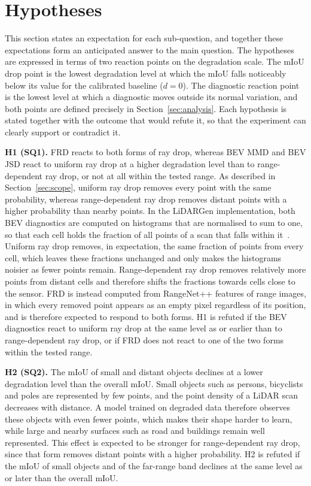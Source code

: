 \section{Hypotheses}\label{sec:hypotheses}
This section states an expectation for each sub-question, and together these expectations form an anticipated answer to the main question. The hypotheses are expressed in terms of two reaction points on the degradation scale. The mIoU drop point is the lowest degradation level at which the mIoU falls noticeably below its value for the calibrated baseline ($d=0$). The diagnostic reaction point is the lowest level at which a diagnostic moves outside its normal variation, and both points are defined precisely in Section~\ref{sec:analysis}. Each hypothesis is stated together with the outcome that would refute it, so that the experiment can clearly support or contradict it.

\textbf{H1 (SQ1).} FRD reacts to both forms of ray drop, whereas BEV MMD and BEV JSD react to uniform ray drop at a higher degradation level than to range-dependent ray drop, or not at all within the tested range. As described in Section~\ref{sec:scope}, uniform ray drop removes every point with the same probability, whereas range-dependent ray drop removes distant points with a higher probability than nearby points. In the LiDARGen implementation, both BEV diagnostics are computed on histograms that are normalised to sum to one, so that each cell holds the fraction of all points of a scan that falls within it~\cite{zyrianovLearningGenerateRealistic2022}. Uniform ray drop removes, in expectation, the same fraction of points from every cell, which leaves these fractions unchanged and only makes the histograms noisier as fewer points remain. Range-dependent ray drop removes relatively more points from distant cells and therefore shifts the fractions towards cells close to the sensor. FRD is instead computed from RangeNet++ features of range images, in which every removed point appears as an empty pixel regardless of its position, and is therefore expected to respond to both forms. H1 is refuted if the BEV diagnostics react to uniform ray drop at the same level as or earlier than to range-dependent ray drop, or if FRD does not react to one of the two forms within the tested range.

\textbf{H2 (SQ2).} The mIoU of small and distant objects declines at a lower degradation level than the overall mIoU. Small objects such as persons, bicyclists and poles are represented by few points, and the point density of a LiDAR scan decreases with distance. A model trained on degraded data therefore observes these objects with even fewer points, which makes their shape harder to learn, while large and nearby surfaces such as road and buildings remain well represented. This effect is expected to be stronger for range-dependent ray drop, since that form removes distant points with a higher probability. H2 is refuted if the mIoU of small objects and of the far-range band declines at the same level as or later than the overall mIoU.

